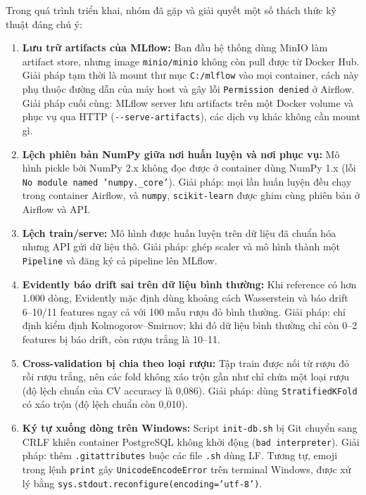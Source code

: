 \documentclass[12pt,a4paper]{report}
\begin{document}
Trong quá trình triển khai, nhóm đã gặp và giải quyết một số thách thức kỹ thuật đáng chú ý:

\begin{enumerate}
  \item \textbf{Lưu trữ artifacts của MLflow:} Ban đầu hệ thống dùng MinIO làm artifact store, nhưng image \texttt{minio/minio} không còn pull được từ Docker Hub. Giải pháp tạm thời là mount thư mục \texttt{C:/mlflow} vào mọi container, cách này phụ thuộc đường dẫn của máy host và gây lỗi \texttt{Permission denied} ở Airflow. Giải pháp cuối cùng: MLflow server lưu artifacts trên một Docker volume và phục vụ qua HTTP (\texttt{-{}-serve-artifacts}), các dịch vụ khác không cần mount gì.

  \item \textbf{Lệch phiên bản NumPy giữa nơi huấn luyện và nơi phục vụ:} Mô hình pickle bởi NumPy 2.x không đọc được ở container dùng NumPy 1.x (lỗi \texttt{No module named 'numpy.\_core'}). Giải pháp: mọi lần huấn luyện đều chạy trong container Airflow, và \texttt{numpy}, \texttt{scikit-learn} được ghim cùng phiên bản ở Airflow và API.

  \item \textbf{Lệch train/serve:} Mô hình được huấn luyện trên dữ liệu đã chuẩn hóa nhưng API gửi dữ liệu thô. Giải pháp: ghép scaler và mô hình thành một \texttt{Pipeline} và đăng ký cả pipeline lên MLflow.

  \item \textbf{Evidently báo drift sai trên dữ liệu bình thường:} Khi reference có hơn 1.000 dòng, Evidently mặc định dùng khoảng cách Wasserstein và báo drift 6--10/11 features ngay cả với 100 mẫu rượu đỏ bình thường. Giải pháp: chỉ định kiểm định Kolmogorov--Smirnov; khi đó dữ liệu bình thường chỉ còn 0--2 features bị báo drift, còn rượu trắng là 10--11.

  \item \textbf{Cross-validation bị chia theo loại rượu:} Tập train được nối từ rượu đỏ rồi rượu trắng, nên các fold không xáo trộn gần như chỉ chứa một loại rượu (độ lệch chuẩn của CV accuracy là 0,086). Giải pháp: dùng \texttt{StratifiedKFold} có xáo trộn (độ lệch chuẩn còn 0,010).

  \item \textbf{Ký tự xuống dòng trên Windows:} Script \texttt{init-db.sh} bị Git chuyển sang CRLF khiến container PostgreSQL không khởi động (\texttt{bad interpreter}). Giải pháp: thêm \texttt{.gitattributes} buộc các file \texttt{.sh} dùng LF. Tương tự, emoji trong lệnh \texttt{print} gây \texttt{UnicodeEncodeError} trên terminal Windows, được xử lý bằng \texttt{sys.stdout.reconfigure(encoding='utf-8')}.
\end{enumerate}
\end{document}
